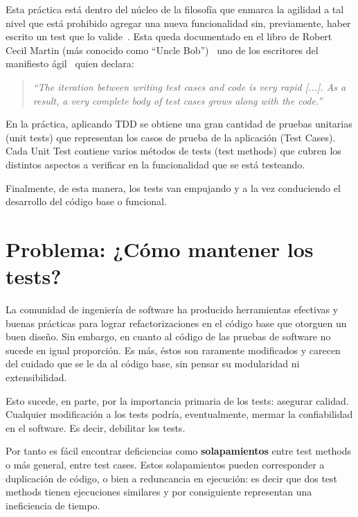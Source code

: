 %
%


\par Esta práctica está dentro del núcleo de la filosofía que enmarca la agilidad a tal nivel que está prohibido agregar una nueva funcionalidad sin, previamente, haber escrito un test que lo valide~\cite{Beck02a}. Esta queda documentado en el libro de Robert Cecil Martin (más conocido como ``Uncle Bob'')~\cite{Mart02b} uno de los escritores del manifiesto ágil~\cite{Fowl01a} quien declara:

\begin{quote}
\emph{``The iteration between writing test cases and code is very rapid [...]. As a result, a very complete body of test cases grows along with the code.''}
\end{quote}


\par En la práctica, aplicando TDD se obtiene una gran cantidad de pruebas unitarias (unit tests) que representan los casos de prueba de la aplicación (Test Cases). Cada Unit Test contiene varios métodos de tests (test methods) que cubren los distintos aspectos a verificar en la funcionalidad que se está testeando.

\par Finalmente, de esta manera, los tests van empujando y a la vez conduciendo el desarrollo del código base o funcional.


\section{Problema: ¿Cómo mantener los tests?}

\par La comunidad de ingeniería de software ha producido herramientas efectivas y buenas prácticas para lograr refactorizaciones en el código base que otorguen un buen diseño. Sin embargo, en cuanto al código de las pruebas de software no sucede en igual proporción. Es más, éstos son raramente modificados y carecen del cuidado que se le da al código base, sin pensar su modularidad ni extensibilidad. 

\par Esto sucede, en parte, por la importancia primaria de los tests: asegurar calidad. Cualquier modificación a los tests podría, eventualmente, mermar la confiabilidad en el software. Es decir, debilitar los tests. 

\par Por tanto es fácil encontrar deficiencias como \textbf{solapamientos} entre test methods o más general, entre test cases. Estos solapamientos pueden corresponder a duplicación de código, o bien a reduncancia en ejecución: es decir que dos test methods tienen ejecuciones similares y por consiguiente representan una ineficiencia de tiempo.

